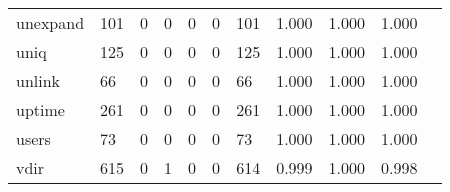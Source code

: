 \begin{longtable}{lp{1.2cm}p{1.2cm}p{1.2cm}p{1.2cm}p{1.2cm}p{1.2cm}p{1.2cm}p{1.2cm}p{1.2cm}p{1.2cm}}
unexpand  &                                   101 &                                                  0 &                                                  0 &                                                  0 &                                                  0 &                                                101 &                                              1.000 &                                              1.000 &                                              1.000 \\
uniq      &                                   125 &                                                  0 &                                                  0 &                                                  0 &                                                  0 &                                                125 &                                              1.000 &                                              1.000 &                                              1.000 \\
unlink    &                                    66 &                                                  0 &                                                  0 &                                                  0 &                                                  0 &                                                 66 &                                              1.000 &                                              1.000 &                                              1.000 \\
uptime    &                                   261 &                                                  0 &                                                  0 &                                                  0 &                                                  0 &                                                261 &                                              1.000 &                                              1.000 &                                              1.000 \\
users     &                                    73 &                                                  0 &                                                  0 &                                                  0 &                                                  0 &                                                 73 &                                              1.000 &                                              1.000 &                                              1.000 \\
vdir      &                                   615 &                                                  0 &                                                  1 &                                                  0 &                                                  0 &                                                614 &                                              0.999 &                                              1.000 &                                              0.998 \\

\end{longtable}
